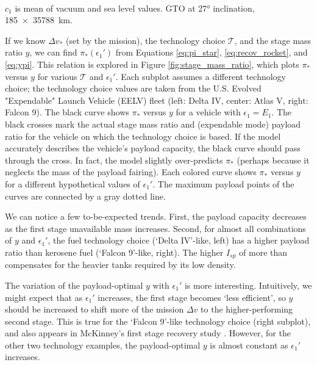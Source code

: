 \documentclass[conf]{new-aiaa}
\begin{document}
\begin{table}
\begin{tabular}{p{3cm} M{2.5cm} M{2.5cm} c c c}
		 \hline
	\end{tabular}
	\\$c_1$ is mean of vacuum and sea level values. GTO at \ang{27} inclination, \SI{185 x 35788}{\kilo\meter}.
\end{table}

If we know $\Delta v_*$ (set by the mission), the technology choice $\mathcal{T}$, and the stage mass ratio $y$, we can find $\pi_*(\epsilon_1')$ from Equations \ref{eq:pi_star}, \ref{eq:recov_rocket}, and \ref{eq:ypi}. This relation is explored in Figure \ref{fig:stage_mass_ratio}, which plots $\pi_*$ versus $y$ for various $\mathcal{T}$ and $\epsilon_1'$. Each subplot assumes a different technology choice; the technology choice values are taken from the U.S. Evolved "Expendable" Launch Vehicle (EELV) fleet (left: Delta IV, center: Atlas V, right: Falcon 9). The black curve shows $\pi_*$ versus $y$ for a vehicle with $\epsilon_1=E_1$. The black crosses mark the actual stage mass ratio and (expendable mode) payload ratio for the vehicle on which the technology choice is based. If the model accurately describes the vehicle's payload capacity, the black curve should pass through the cross. In fact, the model slightly over-predicts $\pi_*$ (perhaps because it neglects the mass of the payload fairing).  
Each colored curve shows $\pi_*$ versus $y$ for a different hypothetical values of $\epsilon_1'$. The maximum payload points of the curves are connected by a gray dotted line.

We can notice a few to-be-expected trends. First, the payload capacity decreases as the first stage unavailable mass increases. Second, for almost all combinations of $y$ and $\epsilon_1'$, the  fuel technology choice (`Delta IV'-like, left) has a higher payload ratio than kerosene fuel (`Falcon 9'-like, right). The higher $I_{sp}$ of  more than compensates for the heavier tanks required by its low density.

The variation of the payload-optimal $y$ with $\epsilon_1'$ is more interesting. Intuitively, we might expect that as $\epsilon_1'$ increases, the first stage becomes `less efficient', so $y$ should be increased to shift more of the mission $\Delta v$ to the higher-performing second stage. This is true for the `Falcon 9'-like technology choice (right subplot), and also appears in McKinney's first stage recovery study \cite{McKinney1986}. However, for the other two technology examples, the payload-optimal $y$ is almost constant as $\epsilon_1'$ increases.
\end{document}
